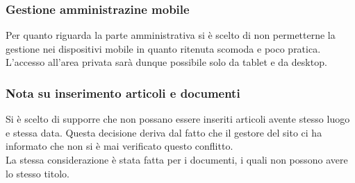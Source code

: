 \subsubsection{Gestione amministrazine mobile}
Per quanto riguarda la parte amministrativa si \`e scelto di non permetterne la gestione nei dispositivi mobile in quanto ritenuta scomoda e poco pratica. \\
 L'accesso all'area privata sar\`a dunque possibile solo da tablet e da desktop.

\subsubsection{Nota su inserimento articoli e documenti}
Si \`e scelto di supporre che non possano essere inseriti articoli avente stesso luogo e stessa data. Questa decisione deriva dal fatto che il gestore del sito ci ha informato che non si \`e mai verificato questo conflitto.
\\ La stessa considerazione \`e stata fatta per i documenti, i quali non possono avere lo stesso titolo.
